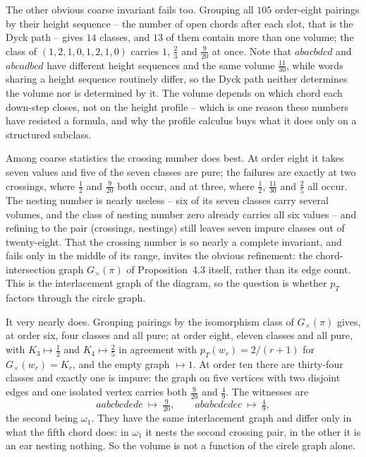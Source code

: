 The other obvious coarse invariant fails too.  Grouping all $105$
order-eight pairings by their height sequence -- the number of open
chords after each slot, that is the Dyck path -- gives $14$ classes, and
$13$ of them contain more than one volume; the class of
$(1,2,1,0,1,2,1,0)$ carries $1$, $\tfrac23$ and $\tfrac9{20}$ at once.
Note that $abacbdcd$ and $abcadbcd$ have different height sequences and
the same volume $\tfrac{11}{30}$, while words sharing a height sequence
routinely differ, so the Dyck path neither determines the volume nor is
determined by it.  The volume depends on which chord each down-step
closes, not on the height profile -- which is one reason these numbers
have resisted a formula, and why the profile calculus buys what it does
only on a structured subclass.

Among coarse statistics the crossing number does best.  At order eight
it takes seven values and five of the seven classes are pure; the
failures are exactly at two crossings, where $\tfrac12$ and $\tfrac9{20}$
both occur, and at three, where $\tfrac12$, $\tfrac{11}{30}$ and
$\tfrac25$ all occur.  The nesting number is nearly useless -- six of its
seven classes carry several volumes, and the class of nesting number
zero already carries all six values -- and refining to the pair
(crossings, nestings) still leaves seven impure classes out of
twenty-eight.  That the crossing number is so nearly a complete
invariant, and fails only in the middle of its range, invites the obvious
refinement: the chord-intersection graph $G_\times(\pi)$ of
Proposition~4.3 itself, rather than its edge count.  This is the
interlacement graph of the diagram, so the question is whether $p_T$
factors through the circle graph.

It very nearly does.  Grouping pairings by the isomorphism class of
$G_\times(\pi)$ gives, at order six, four classes and all pure; at order
eight, eleven classes and all pure, with $K_3\mapsto\tfrac12$ and
$K_4\mapsto\tfrac25$ in agreement with $p_T(w_r)=2/(r+1)$ for
$G_\times(w_r)=K_r$, and the empty graph $\mapsto1$.  At order ten there
are thirty-four classes and exactly one is impure: the graph on five
vertices with two disjoint edges and one isolated vertex carries both
$\tfrac9{20}$ and $\tfrac49$.  The witnesses are
\[
aabcbcdede\ \mapsto\ \tfrac9{20},\qquad
ababcdedec\ \mapsto\ \tfrac49 ,
\]
the second being $\omega_1$.  They have the same interlacement graph and
differ only in what the fifth chord does: in $\omega_1$ it nests the
second crossing pair, in the other it is an ear nesting nothing.  So the
volume is not a function of the circle graph alone.

